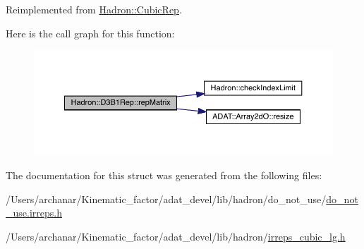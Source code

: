 Reimplemented from \mbox{\hyperlink{structHadron_1_1CubicRep_ac5d7e9e6f4ab1158b5fce3e4ad9e8005}{Hadron\+::\+Cubic\+Rep}}.

Here is the call graph for this function\+:
\nopagebreak
\begin{figure}[H]
\begin{center}
\leavevmode
\includegraphics[width=350pt]{de/dc2/structHadron_1_1D3B1Rep_a2a0563aa28c476f89e8b13f3a95b7cfd_cgraph}
\end{center}
\end{figure}


The documentation for this struct was generated from the following files\+:\begin{DoxyCompactItemize}
\item 
/\+Users/archanar/\+Kinematic\+\_\+factor/adat\+\_\+devel/lib/hadron/do\+\_\+not\+\_\+use/\mbox{\hyperlink{do__not__use_8irreps_8h}{do\+\_\+not\+\_\+use.\+irreps.\+h}}\item 
/\+Users/archanar/\+Kinematic\+\_\+factor/adat\+\_\+devel/lib/hadron/\mbox{\hyperlink{lib_2hadron_2irreps__cubic__lg_8h}{irreps\+\_\+cubic\+\_\+lg.\+h}}\end{DoxyCompactItemize}
